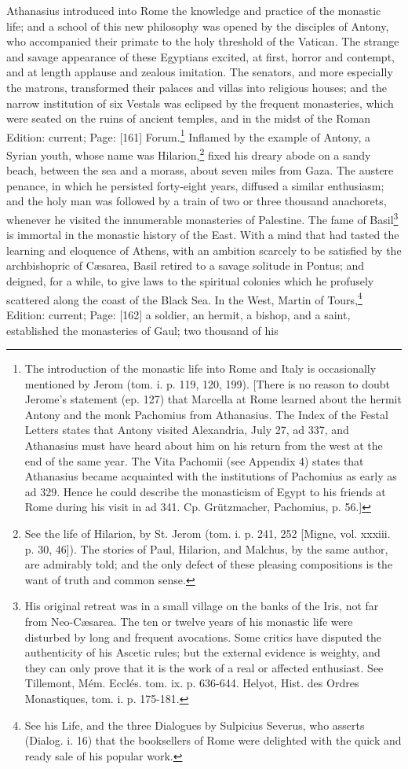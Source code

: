 Athanasius introduced into Rome the knowledge and practice of the monastic life; and a school of this new philosophy was opened by the disciples of Antony, who accompanied their primate to the holy threshold of the Vatican. The strange and savage appearance of these Egyptians excited, at first, horror and contempt, and at length applause and zealous imitation. The senators, and more especially the matrons, transformed their palaces and villas into religious houses; and the narrow institution of six Vestals was eclipsed by the frequent monasteries, which were seated on the ruins of ancient temples, and in the midst of the Roman Edition: current; Page: [161] Forum.\footnote{The introduction of the monastic life into Rome and Italy is occasionally mentioned by Jerom (tom. i. p. 119, 120, 199). [There is no reason to doubt Jerome\texthebrew{}’s statement (ep. 127) that Marcella at Rome learned about the hermit Antony and the monk Pachomius from Athanasius. The Index of the Festal Letters states that Antony visited Alexandria, July 27, ad 337, and Athanasius must have heard about him on his return from the west at the end of the same year. The Vita Pachomii (see Appendix 4) states that Athanasius became acquainted with the institutions of Pachomius as early as ad 329. Hence he could describe the monasticism of Egypt to his friends at Rome during his visit in ad 341. Cp. Grützmacher, Pachomius, p. 56.]} Inflamed by the example of Antony, a Syrian youth, whose name was Hilarion,\footnote{See the life of Hilarion, by St. Jerom (tom. i. p. 241, 252 [Migne, vol. xxxiii. p. 30, 46]). The stories of Paul, Hilarion, and Malchus, by the same author, are admirably told; and the only defect of these pleasing compositions is the want of truth and common sense.} fixed his dreary abode on a sandy beach, between the sea and a morass, about seven miles from Gaza. The austere penance, in which he persisted forty-eight years, diffused a similar enthusiasm; and the holy man was followed by a train of two or three thousand anachorets, whenever he visited the innumerable monasteries of Palestine. The fame of Basil\footnote{His original retreat was in a small village on the banks of the Iris, not far from Neo-Cæsarea. The ten or twelve years of his monastic life were disturbed by long and frequent avocations. Some critics have disputed the authenticity of his Ascetic rules; but the external evidence is weighty, and they can only prove that it is the work of a real or affected enthusiast. See Tillemont, Mém. Ecclés. tom. ix. p. 636-644. Helyot, Hist. des Ordres Monastiques, tom. i. p. 175-181.} is immortal in the monastic history of the East. With a mind that had tasted the learning and eloquence of Athens, with an ambition scarcely to be satisfied by the archbishopric of Cæsarea, Basil retired to a savage solitude in Pontus; and deigned, for a while, to give laws to the spiritual colonies which he profusely scattered along the coast of the Black Sea. In the West, Martin of Tours,\footnote{See his Life, and the three Dialogues by Sulpicius Severus, who asserts (Dialog. i. 16) that the booksellers of Rome were delighted with the quick and ready sale of his popular work.} Edition: current; Page: [162] a soldier, an hermit, a bishop, and a saint, established the monasteries of Gaul; two thousand of his 